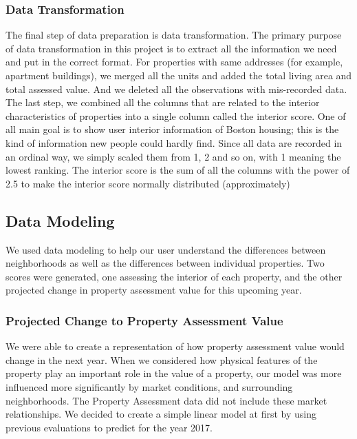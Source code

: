 \documentclass[12pt]{article}
\begin{document}
\subsubsection{Data Transformation}

The final step of data preparation is data transformation. The primary purpose of data transformation in this project is to extract all the information we need and put in the correct format. For properties with same addresses (for example, apartment buildings), we merged all the units and added the total living area and total assessed value. And we deleted all the observations with mis-recorded data. The last step, we combined all the columns that are related to the interior characteristics of properties into a single column called the interior score. One of all main goal is to show user interior information of Boston housing; this is the kind of information new people could hardly find. Since all data are recorded in an ordinal way, we simply scaled them from 1, 2 and so on, with 1 meaning the lowest ranking. The interior score is the sum of all the columns with the power of 2.5 to make the interior score normally distributed (approximately)

\subsection{Data Modeling}

We used data modeling to help our user understand the differences between
neighborhoods as well as the differences between individual properties.
Two scores were generated, one assessing the interior of each property,
and the other projected change in property assessment value for this
upcoming year. 

\subsubsection{Projected Change to Property Assessment Value}

We were able to create a representation of how property assessment
value would change in the next year. When we considered how physical
features of the property play an important role in the value of a
property, our model was more influenced more significantly by market
conditions, and surrounding neighborhoods. The Property Assessment data
did not include these market relationships. We decided to create a
simple linear model at first by using previous evaluations to predict for
the year 2017.
\end{document}
